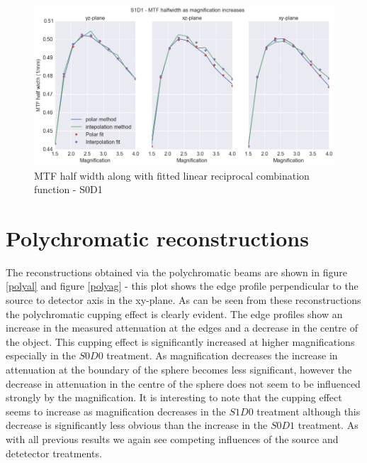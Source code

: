 \documentclass[
  twoside,
  11pt, a4paper,
  footinclude=true,
  headinclude=true,
  cleardoublepage=empty
]{scrbook}
\begin{document}
\begin{figure}[h!]
  \centering
    \includegraphics[width=\textwidth]{code/MTF_and_PSF/MTF_Interp_Polar_Plots_files/MTF_Interp_Polar_Plots_8_1.png}
    \caption{MTF half width along with fitted linear reciprocal combination function - S0D1}
        \label{S1D1half}
\end{figure}





\section{Polychromatic reconstructions}

The reconstructions obtained via the polychromatic beams are shown in figure \ref{polyal} and figure \ref{polyag} - this plot shows the edge profile perpendicular to the source to detector axis in the xy-plane. As can be seen from these reconstructions the polychromatic cupping effect is clearly evident. The edge profiles show an increase in the measured attenuation at the edges and a decrease in the centre of the object. This cupping effect is significantly increased at higher magnifications especially in the $S0D0$ treatment. As magnification decreases the increase in attenuation at the boundary of the sphere becomes less significant, however the decrease in attenuation in the centre of the sphere does not seem to be influenced strongly by the magnification. It is interesting to note that the cupping effect seems to increase as magnification decreases in the $S1D0$ treatment although this decrease is significantly less obvious than the increase in the $S0D1$ treatment. As with all previous results we again see competing influences of the source and detetector treatments.
\end{document}
